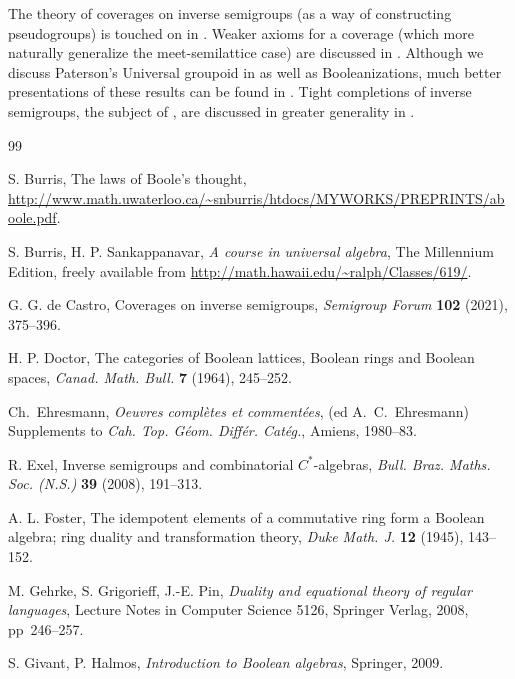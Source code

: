 \documentclass[a4paper]{amsart}
\begin{document}
The theory of coverages on inverse semigroups (as a way of constructing pseudogroups)
is touched on in \cite[Section 4]{LL}.
Weaker axioms for a coverage (which more naturally generalize the meet-semilattice case)
are discussed in \cite{Castro}.
Although we discuss Paterson's Universal groupoid in \cite[Section 5.1]{LL}
as well as Booleanizations, much better presentations of these results can be found in \cite{Lawson2020}. 
Tight completions of inverse semigroups, the subject of \cite[Section 5.2]{LL},
are discussed in greater generality in \cite{LV}.


\begin{thebibliography}{99}



 S. Burris, The laws of Boole's thought, \url{http://www.math.uwaterloo.ca/~snburris/htdocs/MYWORKS/PREPRINTS/aboole.pdf}.

 S. Burris, H. P. Sankappanavar, {\em A course in universal algebra}, The Millennium Edition, freely available from \url{http://math.hawaii.edu/~ralph/Classes/619/}.

 G. G. de Castro, Coverages on inverse semigroups, {\em Semigroup Forum} {\bf 102} (2021), 375--396.

 H. P. Doctor, The categories of Boolean lattices, Boolean rings and Boolean spaces, {\em Canad. Math. Bull.} {\bf 7} (1964), 245--252.

 Ch.~Ehresmann, {\em Oeuvres compl\`etes et comment\'ees}, (ed A.~C.~Ehresmann) 
Supplements to {\em Cah. Top. G\'eom.  Diff\'er. Cat\'eg.}, Amiens, 1980--83.

 R. Exel, Inverse semigroups and combinatorial $C^{\ast}$-algebras, {\em Bull. Braz. Maths. Soc. (N.S.)} {\bf 39} (2008), 191--313.

 A. L. Foster, The idempotent elements of a commutative ring form a Boolean algebra; ring duality and transformation theory,
{\em Duke Math. J.} {\bf 12} (1945), 143--152.

 M. Gehrke, S. Grigorieff, J.-E. Pin, {\em Duality and equational theory of regular languages}, 
Lecture Notes in Computer Science 5126, Springer Verlag, 2008, pp~246--257. 

 S. Givant, P. Halmos, {\em Introduction to Boolean algebras}, Springer, 2009.


\end{thebibliography}
\end{document}
